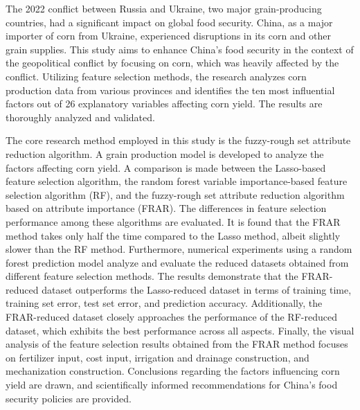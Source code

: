 The 2022 conflict between Russia and Ukraine, two major grain-producing countries, had a significant impact on global food security. China, as a major importer of corn from Ukraine, experienced disruptions in its corn and other grain supplies. This study aims to enhance China's food security in the context of the geopolitical conflict by focusing on corn, which was heavily affected by the conflict. Utilizing feature selection methods, the research analyzes corn production data from various provinces and identifies the ten most influential factors out of 26 explanatory variables affecting corn yield. The results are thoroughly analyzed and validated.

The core research method employed in this study is the fuzzy-rough set attribute reduction algorithm. A grain production model is developed to analyze the factors affecting corn yield. A comparison is made between the Lasso-based feature selection algorithm, the random forest variable importance-based feature selection algorithm (RF), and the fuzzy-rough set attribute reduction algorithm based on attribute importance (FRAR). The differences in feature selection performance among these algorithms are evaluated. It is found that the FRAR method takes only half the time compared to the Lasso method, albeit slightly slower than the RF method. Furthermore, numerical experiments using a random forest prediction model analyze and evaluate the reduced datasets obtained from different feature selection methods. The results demonstrate that the FRAR-reduced dataset outperforms the Lasso-reduced dataset in terms of training time, training set error, test set error, and prediction accuracy. Additionally, the FRAR-reduced dataset closely approaches the performance of the RF-reduced dataset, which exhibits the best performance across all aspects. Finally, the visual analysis of the feature selection results obtained from the FRAR method focuses on fertilizer input, cost input, irrigation and drainage construction, and mechanization construction. Conclusions regarding the factors influencing corn yield are drawn, and scientifically informed recommendations for China's food security policies are provided.